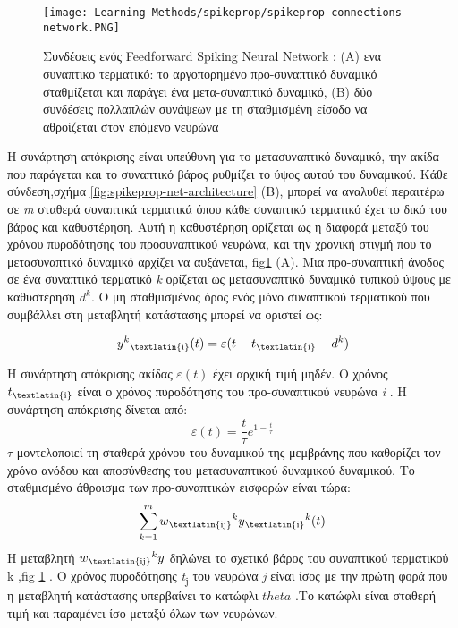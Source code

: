 \documentclass[12pt]{report}
\begin{document}
\begin{figure}[htp]
    \centering
    \texttt{[image: Learning Methods/spikeprop/spikeprop-connections-network.PNG]}
    \caption{Συνδέσεις ενός \textlatin{Feedforward Spiking Neural Network} : (A) ενα συναπτικο τερματικό: το αργοπορημένο
προ-συναπτικό δυναμικό σταθμίζεται και παράγει ένα μετα-συναπτικό δυναμικό, (Β)
δύο συνδέσεις πολλαπλών συνάψεων με τη σταθμισμένη είσοδο να αθροίζεται στον επόμενο νευρώνα}
    \label{fig:spikeprop-connections-network}
\end{figure}

Η συνάρτηση απόκρισης είναι υπεύθυνη για το μετασυναπτικό δυναμικό, την ακίδα που παράγεται και το συναπτικό βάρος ρυθμίζει το ύψος αυτού του δυναμικού. Κάθε σύνδεση,σχήμα \ref{fig:spikeprop-net-architecture} (B), μπορεί να αναλυθεί περαιτέρω σε \textit{\textlatin{m}} σταθερά συναπτικά τερματικά όπου κάθε συναπτικό τερματικό έχει το δικό του βάρος και καθυστέρηση. Αυτή η καθυστέρηση ορίζεται ως η διαφορά μεταξύ του χρόνου πυροδότησης του προσυναπτικού νευρώνα, και την χρονική στιγμή που το μετασυναπτικό δυναμικό αρχίζει να αυξάνεται, fig\ref{fig:spikeprop-connections-network} (A). Μια προ-συναπτική άνοδος σε ένα συναπτικό τερματικό \textit{k} ορίζεται ως μετασυναπτικό δυναμικό τυπικού ύψους με καθυστέρηση \(d^k\). Ο μη σταθμισμένος όρος ενός μόνο συναπτικού τερματικού που συμβάλλει στη μεταβλητή κατάστασης μπορεί να οριστεί ως:

\begin{equation}
    y^k\textsubscript{\textlatin{i}}(t) = \varepsilon(t-t\textsubscript{\textlatin{i}}-d^k) 
\end{equation}

Η συνάρτηση απόκρισης ακίδας  \(\varepsilon(t)\) έχει αρχική τιμή μηδέν. Ο χρόνος \(t\textsubscript{\textlatin{i}}\) είναι ο χρόνος πυροδότησης του προ-συναπτικού νευρώνα \textit{\textlatin{i}} . Η συνάρτηση απόκρισης δίνεται από: 
\begin{equation}
    \varepsilon(t)=\frac{t}{\tau}e^{1-\frac{t}{\tau}}
\end{equation}
\(\tau\) μοντελοποιεί τη σταθερά χρόνου του δυναμικού της μεμβράνης  που καθορίζει τον χρόνο ανόδου και αποσύνθεσης του μετασυναπτικού δυναμικού δυναμικού. Το σταθμισμένο άθροισμα των προ-συναπτικών εισφορών είναι τώρα:
\[ \sum_{k=1}^{m}w\textsubscript{\textlatin{ij}}^ky\textsubscript{\textlatin{i}}^k(t) \]
H μεταβλητή \(w\textsubscript{\textlatin{ij}}^ky\) δηλώνει το σχετικό βάρος του συναπτικού τερματικού k ,\textlatin{fig} \ref{fig:spikeprop-connections-network} . Ο χρόνος πυροδότησης \textit{\textlatin{t}}\textsubscript{\textlatin{j}} του νευρώνα \textit{\textlatin{j}} είναι ίσος με την πρώτη φορά που η μεταβλητή κατάστασης υπερβαίνει το κατώφλι \(theta\) .Το κατώφλι είναι σταθερή τιμή και παραμένει ίσο μεταξύ όλων των νευρώνων.
\end{document}

